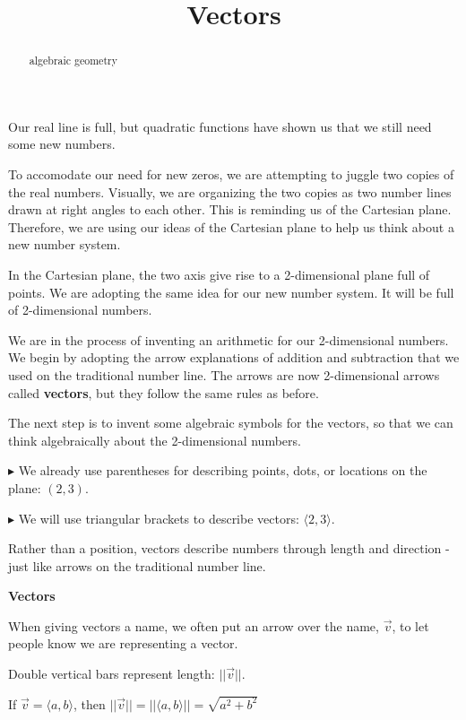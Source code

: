 \documentclass{ximera}
\title{Vectors}
\begin{document}
\begin{abstract}
algebraic geometry
\end{abstract}
\maketitle






Our real line is full, but quadratic functions have shown us that we still need some new numbers.  

To accomodate our need for new zeros, we are attempting to juggle two copies of the real numbers. Visually, we are organizing the two copies as two number lines drawn at right angles to each other.  This is reminding us of the Cartesian plane.  Therefore, we are using our ideas of the Cartesian plane to help us think about a new number system.  



In the Cartesian plane, the two axis give rise to a 2-dimensional plane full of points.  We are adopting the same idea for our new number system.  It will be full of 2-dimensional numbers.


We are in the process of inventing an arithmetic for our 2-dimensional numbers.  We begin by adopting the arrow explanations of addition and subtraction that we used on the traditional number line. The arrows are now 2-dimensional arrows called \textbf{vectors}, but they follow the same rules as before.

The next step is to invent some algebraic symbols for the vectors, so that we can think algebraically about the 2-dimensional numbers.


$\blacktriangleright$ We already use parentheses for describing points, dots, or locations on the plane: $(2, 3)$.


$\blacktriangleright$ We will use triangular brackets to describe vectors: $\langle 2, 3 \rangle$.  

Rather than a position, vectors describe numbers through length and direction - just like arrows on the traditional number line. 



\begin{notation}  \textbf{\textcolor{red!50!green}{Vectors}} 


When giving vectors a name, we often put an arrow over the name, $\vec{v}$, to let people know we are representing a vector. 

Double vertical bars represent length: $|| \vec{v} ||$.

If $\vec{v} = \langle a, b \rangle$, then $|| \vec{v} || = || \langle a, b \rangle || = \sqrt{a^2 + b^2}$

\end{notation}
\end{document}
